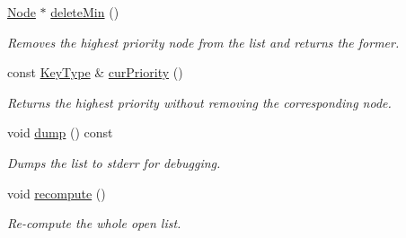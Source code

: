 \begin{DoxyCompactItemize}
\hyperlink{structopenList_1_1BucketedStdMap__T_a54e9b34cd8d421140da4db26b700f5d6}{Node} $\ast$ \hyperlink{structopenList_1_1BucketedStdMap__T_a9910b2defecb47c3be19b9e983108e84}{delete\+Min} ()
\begin{DoxyCompactList}\small\item\em Removes the highest priority node from the list and returns the former. \end{DoxyCompactList}\item 
const \hyperlink{structopenList_1_1BucketedStdMap__T_a307af8874eba4b74cfd21f73a335bf0c}{Key\+Type} \& \hyperlink{structopenList_1_1BucketedStdMap__T_ae01e080acf69308f97e6897b4f1273ec}{cur\+Priority} ()
\begin{DoxyCompactList}\small\item\em Returns the highest priority without removing the corresponding node. \end{DoxyCompactList}\item 
void \hyperlink{structopenList_1_1BucketedStdMap__T_aabd7ec53a70c8708ffc4472f35ea2016}{dump} () const \hypertarget{structopenList_1_1BucketedStdMap__T_aabd7ec53a70c8708ffc4472f35ea2016}{}\label{structopenList_1_1BucketedStdMap__T_aabd7ec53a70c8708ffc4472f35ea2016}

\begin{DoxyCompactList}\small\item\em Dumps the list to {\ttfamily stderr} for debugging. \end{DoxyCompactList}\item 
void \hyperlink{structopenList_1_1BucketedStdMap__T_aa404d8c6ccc432f0c21ecd76a7a12767}{recompute} ()
\begin{DoxyCompactList}\small\item\em Re-\/compute the whole open list. \end{DoxyCompactList}\end{DoxyCompactItemize}
